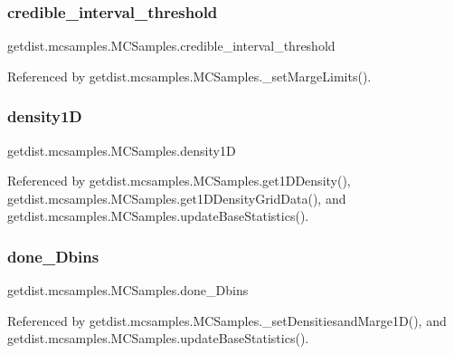 \subsubsection{\texorpdfstring{credible\+\_\+interval\+\_\+threshold}{credible\_interval\_threshold}}
{\footnotesize\ttfamily getdist.\+mcsamples.\+M\+C\+Samples.\+credible\+\_\+interval\+\_\+threshold}



Referenced by getdist.\+mcsamples.\+M\+C\+Samples.\+\_\+set\+Marge\+Limits().

\mbox{\label{classgetdist_1_1mcsamples_1_1MCSamples_a603b68a01e150d4186e8f91f3a7f2d65}} 
\subsubsection{\texorpdfstring{density1D}{density1D}}
{\footnotesize\ttfamily getdist.\+mcsamples.\+M\+C\+Samples.\+density1D}



Referenced by getdist.\+mcsamples.\+M\+C\+Samples.\+get1\+D\+Density(), getdist.\+mcsamples.\+M\+C\+Samples.\+get1\+D\+Density\+Grid\+Data(), and getdist.\+mcsamples.\+M\+C\+Samples.\+update\+Base\+Statistics().

\mbox{\label{classgetdist_1_1mcsamples_1_1MCSamples_a68b95da67810cbcb9ab6dd762141ec51}} 
\subsubsection{\texorpdfstring{done\+\_\+Dbins}{done\_1Dbins}}
{\footnotesize\ttfamily getdist.\+mcsamples.\+M\+C\+Samples.\+done\+\_\+Dbins}



Referenced by getdist.\+mcsamples.\+M\+C\+Samples.\+\_\+set\+Densitiesand\+Marge1\+D(), and getdist.\+mcsamples.\+M\+C\+Samples.\+update\+Base\+Statistics().


